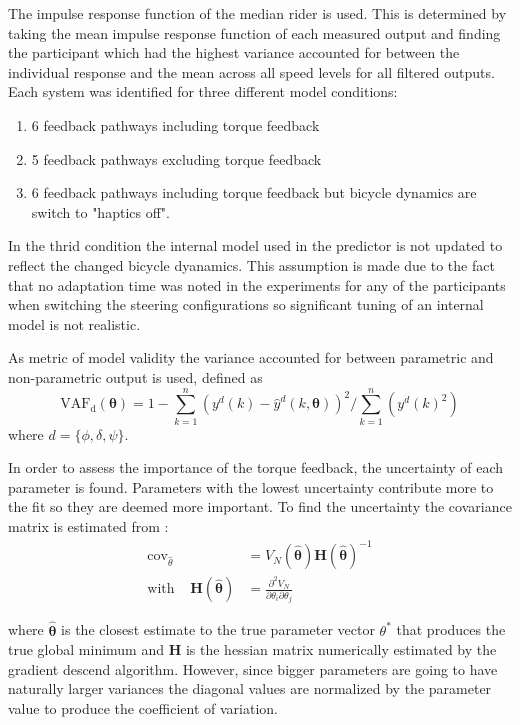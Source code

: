 The impulse response function of the median rider is used. This is determined by taking the mean impulse response function of each measured output and finding the participant which had the highest variance accounted for between the individual response and the mean across all speed levels for all filtered outputs. Each system was identified for three different model conditions: 
\begin{enumerate}
    \item  6 feedback pathways including torque feedback
    \item  5 feedback pathways excluding torque feedback
    \item  6 feedback pathways including torque feedback but bicycle dynamics are switch to "haptics off".
\end{enumerate}
In the thrid condition the internal model used in the predictor is not updated to reflect the changed bicycle dyanamics. This assumption is made due to the fact that no adaptation time  was noted in the experiments for any of the participants when switching the steering configurations so significant tuning of an internal model is not realistic. 

 As metric of model validity the variance accounted for between parametric and non-parametric output is used, defined as
\begin{equation}
\mathrm{VAF_d}(\boldsymbol{\theta})=1 -\sum_{k=1}^{n}\left(y^{d}(k)-\hat{y}^{d}(k, \boldsymbol{\theta})\right)^{2} / \sum_{k=1}^{n}\left(y^{d}(k)^{2}\right)
\end{equation} 
where \ensuremath{d=\{\phi,\delta,\psi\}}. 

In order to assess the importance of the torque feedback, the uncertainty of each parameter is found. Parameters with the lowest uncertainty contribute more to the fit so they are deemed more important. To find the uncertainty the covariance matrix is estimated from :
\begin{align}
    \operatorname{cov}_{\hat{\theta}}  &=V_N(\boldsymbol{\hat{\theta}})\boldsymbol{H}(\boldsymbol{\hat{\theta}})^{-1}
    \label{fig:cov_mat}
    \\ \text{with} \;\;\;\;  \boldsymbol{H}(\boldsymbol{\hat{\theta}})&= \frac{\partial^{2} V_N}{\partial \theta_{i} \partial \theta_{j}}
\end{align}

where \ensuremath{\boldsymbol{\hat{\theta}}} is the closest estimate to the true parameter vector \ensuremath{\theta^*} that produces the true global minimum and \ensuremath{\boldsymbol{H}} is the hessian matrix numerically estimated by the gradient descend algorithm.  However, since bigger parameters are going to have naturally larger variances the diagonal values are normalized by the parameter value to produce the coefficient of variation.

